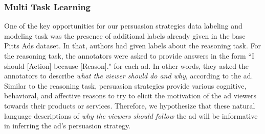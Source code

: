 \documentclass[hidelinks,11pt,a4paper]{report}
\begin{document}
\begin{table}[t]
    \small
        \centering
        \caption{\small Effect of different Modalities and Tasks on the accuracy and performance of the strategy prediction task.}
        \label{tab:modalities}
    \end{table}

\subsubsection{Multi Task Learning}
One of the key opportunities for our persuasion strategies data labeling and modeling task was the presence of additional labels already given in the base Pitts Ads dataset. In that, authors had given labels about the reasoning task. For the reasoning task, the annotators were asked to provide answers in the form ``I should [Action] because [Reason]." for each ad. In other words, they asked the annotators to describe \textit{what the viewer should do and why}, according to
the ad. Similar to the reasoning task, persuasion strategies provide various cognitive, behavioral, and affective reasons to try to elicit the motivation of the ad viewers towards their products or services. Therefore, we hypothesize that these natural language descriptions of \textit{why the viewers should follow} the ad will be informative in inferring the ad's persuasion strategy.
\end{document}
